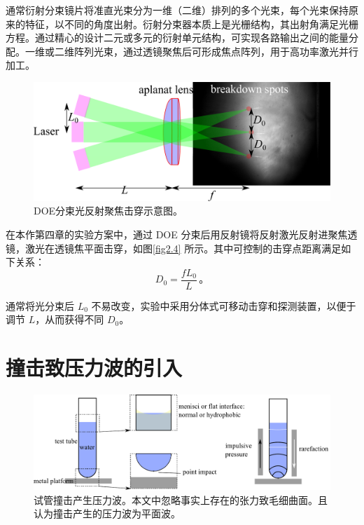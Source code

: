 通常衍射分束镜片将准直光束分为一维（二维）排列的多个光束，每个光束保持原来的特征，以不同的角度出射。衍射分束器本质上是光栅结构，其出射角满足光栅方程。通过精心的设计二元或多元的衍射单元结构，可实现各路输出之间的能量分配。一维或二维阵列光束，通过透镜聚焦后可形成焦点阵列，用于高功率激光并行加工。

\begin{figure}[h]
\centering
\includegraphics[width=0.6\linewidth]{img/fig2.6-eps-converted-to.pdf}
\centering
\caption[DOE分束光反射聚焦击穿示意图]{DOE分束光反射聚焦击穿示意图。}
\label{fig2.6}
\end{figure}



在本作第四章的实验方案中，通过 DOE
分束后用反射镜将反射激光反射进聚焦透镜，激光在透镜焦平面击穿，如图\ref{fig2.4}
所示。其中可控制的击穿点距离满足如下关系： 
\begin{equation}
    D_\mathrm 0=\frac {f L_\mathrm{0}}{L} \,。
    \label{2.1}
\end{equation}


 通常将光分束后 $L_\mathrm{0}$
不易改变，实验中采用分体式可移动击穿和探测装置，以便于调节
$L$，从而获得不同 $D_\mathrm 0$。

\section{撞击致压力波的引入}\label{ux649eux51fbux81f4ux538bux529bux6ce2}


\begin{figure}[h]
\centering
\includegraphics[width=0.9\linewidth]{img/fig2.7-eps-converted-to.pdf}
\centering
\caption[试管撞击产生压力波]{试管撞击产生压力波。本文中忽略事实上存在的张力致毛细曲面。且认为撞击产生的压力波为平面波。}
\label{fig2.7}
\end{figure}


